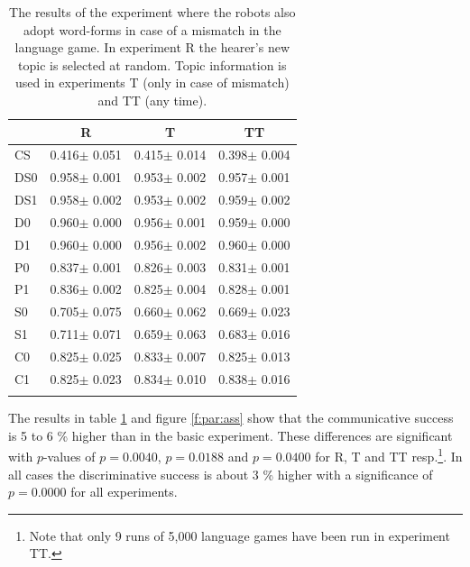 \begin{table}
\centering
\begin{tabular}{lccc}
\lsptoprule
        &       R                       &       T                      &       TT     \\\midrule
CS      &          0.416$\pm$      0.051&          0.415$\pm$      0.014&          0.398$\pm$      0.004\\%
DS0     &          0.958$\pm$      0.001&          0.953$\pm$      0.002&          0.957$\pm$      0.001\\%
DS1     &          0.958$\pm$      0.002&          0.953$\pm$      0.002&          0.959$\pm$      0.002\\%
D0      &          0.960$\pm$      0.000&          0.956$\pm$      0.001&          0.959$\pm$      0.000\\%
D1      &          0.960$\pm$      0.000&          0.956$\pm$      0.002&          0.960$\pm$      0.000\\%
P0      &          0.837$\pm$      0.001&          0.826$\pm$      0.003&          0.831$\pm$      0.001\\%
P1      &          0.836$\pm$      0.002&          0.825$\pm$      0.004&          0.828$\pm$      0.001\\%
S0      &          0.705$\pm$      0.075&          0.660$\pm$      0.062&          0.669$\pm$      0.023\\%
S1      &          0.711$\pm$      0.071&          0.659$\pm$      0.063&          0.683$\pm$      0.016\\%
C0      &          0.825$\pm$      0.025&          0.833$\pm$      0.007&          0.825$\pm$      0.013\\%
C1      &          0.825$\pm$      0.023&          0.834$\pm$      0.010&          0.838$\pm$      0.016\\%
\lspbottomrule
\end{tabular}
\caption{The results of the experiment where the robots also adopt word-forms in case of a mismatch in the language game. In experiment R the hearer's new topic is selected at random. Topic information is used in experiments T (only in case of mismatch) and TT (any time).}
\label{t:lex:ass}
\end{table}

The results in table \ref{t:lex:ass} and figure \ref{f:par:ass} show that the communicative success is 5 to 6 \% higher than in the basic experiment. These differences are significant with $p$-values of $p=0.0040$, $p=0.0188$ and $p=0.0400$ for R, T and TT resp.\footnote{Note that only 9 runs of 5,000 language games have been run in experiment TT.}. In all cases the discriminative success is about 3 \% higher with a significance of $p=0.0000$ for all experiments.

